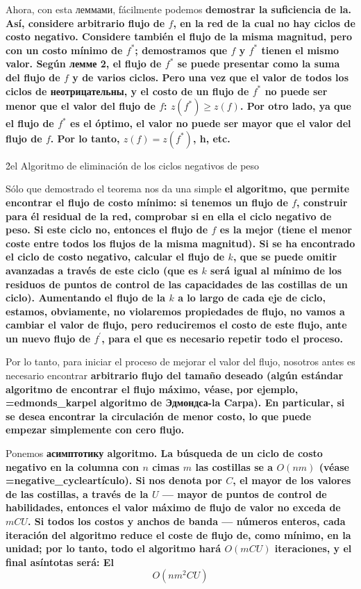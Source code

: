 Ahora, con esta леммами, fácilmente podemos \bf{demostrar la suficiencia de la}. Así, considere arbitrario flujo de $f$, en la red de la cual no hay ciclos de costo negativo. Considere también el flujo de la misma magnitud, pero con un costo mínimo de $f^*$; demostramos que $f$ y $f^*$ tienen el mismo valor. Según лемме 2, el flujo de $f^*$ se puede presentar como la suma del flujo de $f$ y de varios ciclos. Pero una vez que el valor de todos los ciclos de неотрицательны, y el costo de un flujo de $f^*$ no puede ser menor que el valor del flujo de $f$: $z(f^*) \ge z(f)$. Por otro lado, ya que el flujo de $f^*$ es el óptimo, el valor no puede ser mayor que el valor del flujo de $f$. Por lo tanto, $z(f) = z(f^*)$, h, etc.

\h2{el Algoritmo de eliminación de los ciclos negativos de peso}

Sólo que demostrado el teorema nos da una simple \bf{el algoritmo}, que permite encontrar el flujo de costo mínimo: si tenemos un flujo de $f$, construir para él residual de la red, comprobar si en ella el ciclo negativo de peso. Si este ciclo no, entonces el flujo de $f$ es la mejor (tiene el menor coste entre todos los flujos de la misma magnitud). Si se ha encontrado el ciclo de costo negativo, calcular el flujo de $k$, que se puede omitir avanzadas a través de este ciclo (que es $k$ será igual al mínimo de los residuos de puntos de control de las capacidades de las costillas de un ciclo). Aumentando el flujo de la $k$ a lo largo de cada eje de ciclo, estamos, obviamente, no violaremos propiedades de flujo, no vamos a cambiar el valor de flujo, pero reduciremos el costo de este flujo, ante un nuevo flujo de $f^\prime$, para el que es necesario repetir todo el proceso.

Por lo tanto, para iniciar el proceso de mejorar el valor del flujo, nosotros antes es necesario encontrar \bf{arbitrario flujo del tamaño deseado} (algún estándar algoritmo de encontrar el flujo máximo, véase, por ejemplo, \algohref=edmonds_karp{el algoritmo de Эдмондса-la Carpa}). En particular, si se desea encontrar la circulación de menor costo, lo que puede empezar simplemente con cero flujo.

Ponemos \bf{асимптотику} algoritmo. La búsqueda de un ciclo de costo negativo en la columna con $n$ cimas $m$ las costillas se a $O(nm)$ (véase \algohref=negative_cycle{artículo}). Si nos denota por $C$, el mayor de los valores de las costillas, a través de la $U$ --- mayor de puntos de control de habilidades, entonces el valor máximo de flujo de valor no exceda de $mCU$. Si todos los costos y anchos de banda --- números enteros, cada iteración del algoritmo reduce el coste de flujo de, como mínimo, en la unidad; por lo tanto, todo el algoritmo hará $O(mCU)$ iteraciones, y el final asíntotas será:
El $$ O(nm^2CU) $$

